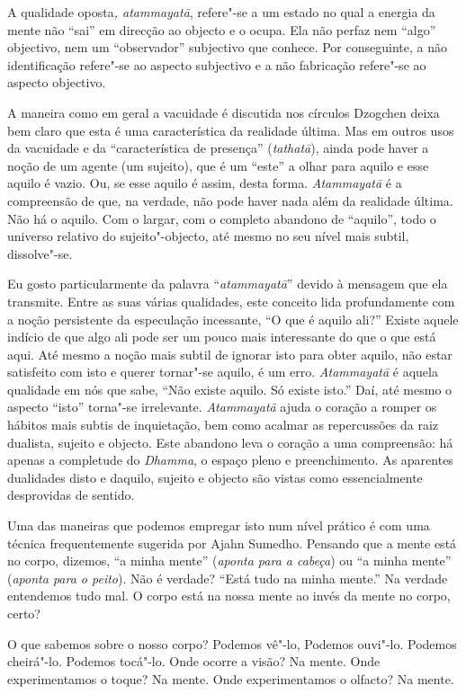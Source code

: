 A qualidade oposta\emph{, atammayatā}, refere"-se a um estado no qual a
energia da mente não ``sai'' em direcção ao objecto e o ocupa. Ela não
perfaz nem ``algo'' objectivo, nem um ``observador'' subjectivo que
conhece. Por conseguinte, a não identificação refere"-se ao aspecto
subjectivo e a não fabricação refere"-se ao aspecto objectivo.

A maneira como em geral a vacuidade é discutida nos círculos
Dzogchen deixa bem claro que esta é uma característica da realidade
última. Mas em outros usos da vacuidade e da ``característica de
presença'' (\emph{tathatā}), ainda pode haver a noção de um agente (um
sujeito), que é um ``este'' a olhar para aquilo e esse aquilo é vazio.
Ou, se esse aquilo é assim, desta forma.  \emph{Atammayatā} é a
compreensão de que, na verdade, não pode haver nada além da realidade
última. Não há o aquilo. Com o largar, com o completo abandono de
``aquilo'', todo o universo relativo do sujeito"-objecto, até mesmo no
seu nível mais subtil, dissolve"-se.

Eu gosto particularmente da palavra ``\emph{atammayatā}'' devido à
mensagem que ela transmite. Entre as suas várias qualidades, este
conceito lida profundamente com a noção persistente da especulação
incessante, ``O que é aquilo ali?'' Existe aquele indício de que algo
ali pode ser um pouco mais interessante do que o que está aqui. Até
mesmo a noção mais subtil de ignorar isto para obter aquilo, não estar
satisfeito com isto e querer tornar"-se aquilo, é um erro.
\emph{Atammayatā} é aquela qualidade em nós que sabe, ``Não existe
aquilo. Só existe isto.'' Daí, até mesmo o aspecto ``isto'' torna"-se
irrelevante.  \emph{Atammayatā} ajuda o coração a romper os hábitos mais
subtis de inquietação, bem como acalmar as repercussões da raiz
dualista, sujeito e objecto. Este abandono leva o coração a uma
compreensão: há apenas a completude do \emph{Dhamma}, o espaço pleno e
preenchimento. As aparentes dualidades disto e daquilo, sujeito e
objecto são vistas como essencialmente desprovidas de sentido.

Uma das maneiras que podemos empregar isto num nível prático é com uma
técnica frequentemente sugerida por Ajahn Sumedho. Pensando que a mente
está no corpo, dizemos, ``a minha mente'' (\emph{aponta para a cabeça})
ou ``a minha mente'' (\emph{aponta para o peito}). Não é verdade? ``Está
tudo na minha mente.'' Na verdade entendemos tudo mal. O corpo está na
nossa mente ao invés da mente no corpo, certo?

O que sabemos sobre o nosso corpo? Podemos vê"-lo, Podemos ouvi"-lo.
Podemos cheirá"-lo. Podemos tocá"-lo. Onde ocorre a visão? Na mente. Onde
experimentamos o toque? Na mente. Onde experimentamos o olfacto? Na
mente.


